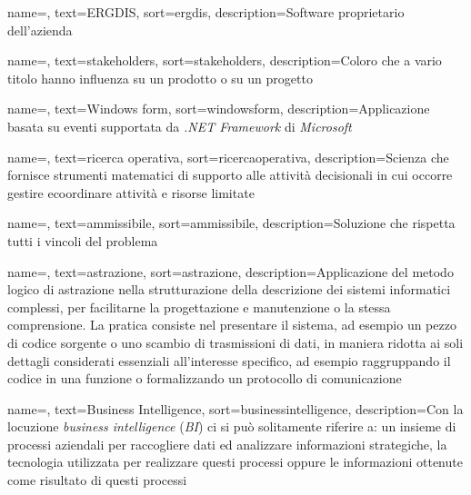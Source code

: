 {
    name=,
    text=ERGDIS,
    sort=ergdis,
    description={Software proprietario dell'azienda \textit{\myCompany}}
}

{
    name=,
    text=stakeholders,
    sort=stakeholders,
    description={Coloro che a vario titolo hanno influenza su un
    prodotto o su un progetto}
}

{
    name=,
    text=Windows form,
    sort=windowsform,
    description={Applicazione basata su eventi
    supportata da \textit{.NET Framework} di \textit{Microsoft}}
}

{
    name=,
    text=ricerca operativa,
    sort=ricercaoperativa,
    description={Scienza che fornisce strumenti matematici di
    supporto alle attività decisionali in cui occorre gestire
    ecoordinare attività e risorse limitate}
}

{
    name=,
    text=ammissibile,
    sort=ammissibile,
    description={Soluzione che rispetta tutti i vincoli del problema}
}

{
    name=,
    text=astrazione,
    sort=astrazione,
    description={Applicazione del metodo logico di astrazione nella strutturazione della
    descrizione dei sistemi informatici complessi, per facilitarne la progettazione e
    manutenzione o la stessa comprensione. La pratica consiste nel presentare il
    sistema, ad esempio un pezzo di codice sorgente o uno scambio di trasmissioni di
    dati, in maniera ridotta ai soli dettagli considerati essenziali all’interesse specifico,
    ad esempio raggruppando il codice in una funzione o formalizzando un protocollo
    di comunicazione}
}

{
    name=,
    text=Business Intelligence,
    sort=businessintelligence,
    description={Con la locuzione \textit{business intelligence}
    (\textit{BI}) ci si può solitamente riferire a: un insieme di processi aziendali per raccogliere dati ed analizzare
    informazioni strategiche, la tecnologia utilizzata per realizzare questi processi
    oppure le informazioni ottenute come risultato di questi processi}
}

